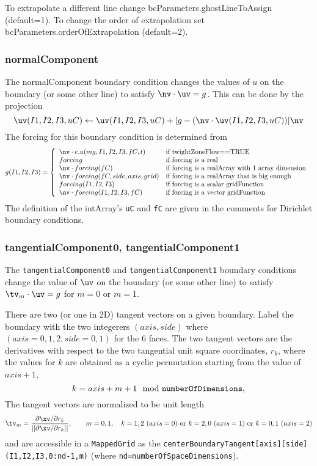 To extrapolate a different line change {\ff bcParameters.ghostLineToAssign}
(default=1). To change the order of extrapolation set
{\ff bcParameters.orderOfExtrapolation} (default=2).




\subsubsection{normalComponent}

The {\ff normalComponent} boundary condition changes the values 
of $u$ on the boundary (or some other line)
to satisfy $\nv\cdot\uv = g $. 
This can be done by the projection
\[
        \uv(I1,I2,I3,uC) \leftarrow \uv(I1,I2,I3,uC) + [g-(\nv\cdot\uv(I1,I2,I3,uC))] \nv
\]
The forcing for this boundary condition is determined from
\[
 g(I1,I2,I3) =  \left\{ \begin{array}{ll}
        \nv\cdot \true u(mg,I1,I2,I3,fC,t) & \mbox{if twightZoneFlow==TRUE} \\
        forcing              & \mbox{if forcing is a real      } \\
    \nv\cdot forcing(fC)           & \mbox{if forcing  is a realArray with 1 array dimension } \\
    \nv\cdot forcing(fC,side,axis,grid) & \mbox{if forcing is a realArray that is big enough} \\
        forcing(I1,I2,I3)  & \mbox{if forcing is a scalar gridFunction} \\
        \nv\cdot forcing(I1,I2,I3,fC)  & \mbox{if forcing is a vector gridFunction} \\
          \end{array}
  \right.
\]
The definition of the intArray's {\tt uC} and {\tt fC} are given in the comments for Dirichlet boundary conditions.

\subsubsection{tangentialComponent0, tangentialComponent1}  \label{sec:tangentialComponent}

  The {\tt tangentialComponent0} and {\tt tangentialComponent1} boundary conditions change the
value of $\uv$ on the boundary (or some other line) to satisfy $\tv_m \cdot\uv = g $ for $m=0$ or $m=1$.

There are two (or one in 2D) tangent vectors on a given boundary. Label the boundary with 
the two integerers $(axis,side)$ where $(axis=0,1,2,side=0,1)$ for the 6 faces. 
The two tangent vectors are the derivatives with respect
to the two tangential unit square coordinates, $r_k$, where the values for $k$ are obtained as a cyclic permutation starting
from the value of $axis+1$,
\[
  k=axis+m+1 \mod {\tt numberOfDimensions},
\]
The tangent vectors are normalized to be unit length
\[
    \tv_m = { {\partial \xv / \partial r_k } \over || {\partial \xv / \partial r_k }|| } , \qquad m=0,1, \quad
    k=1,2~(axis=0)\mbox{~or~} k=2,0~(axis=1)\mbox{~or~} k=0,1~(axis=2)
\]
and are accessible in a {\tt MappedGrid} as the {\tt centerBoundaryTangent[axis][side](I1,I2,I3,0:nd-1,m)} (where 
{\tt nd=numberOfSpaceDimensions}).

